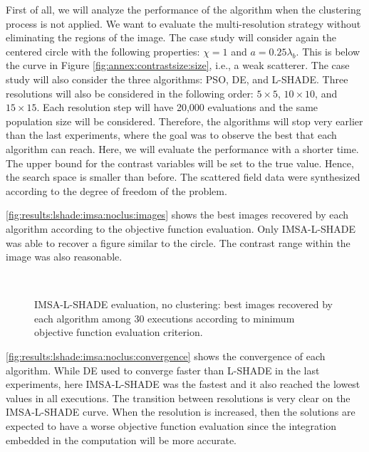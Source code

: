 			First of all, we will analyze the performance of the algorithm when the clustering process is not applied. We want to evaluate the multi-resolution strategy without eliminating the regions of the image. The case study will consider again the centered circle with the following properties: $\chi=1$ and $a=0.25\lambda_b$. This is below the curve in Figure \ref{fig:annex:contrastsize:size}, i.e., a weak scatterer. The case study will also consider the three algorithms: PSO, DE, and L-SHADE. Three resolutions will also be considered in the following order: $5\times5$, $10\times10$, and $15\times15$. Each resolution step will have 20,000 evaluations and the same population size will be considered. Therefore, the algorithms will stop very earlier than the last experiments, where the goal was to observe the best that each algorithm can reach. Here, we will evaluate the performance with a shorter time. The upper bound for the contrast variables will be set to the true value. Hence, the search space is smaller than before. The scattered field data were synthesized according to the degree of freedom of the problem.
			
			\autoref{fig:results:lshade:imsa:noclus:images} shows the best images recovered by each algorithm according to the objective function evaluation. Only IMSA-L-SHADE was able to recover a figure similar to the circle. The contrast range within the image was also reasonable.
			
			\begin{figure}
				\centering
				 \\
				\caption[IMSA-L-SHADE evaluation, no clustering: best recovered images.]{IMSA-L-SHADE evaluation, no clustering: best images recovered by each algorithm among 30 executions according to minimum objective function evaluation criterion.}
				\label{fig:results:lshade:imsa:noclus:images}
			\end{figure}
		
			\autoref{fig:results:lshade:imsa:noclus:convergence} shows the convergence of each algorithm. While DE used to converge faster than L-SHADE in the last experiments, here IMSA-L-SHADE was the fastest and it also reached the lowest values in all executions. The transition between resolutions is very clear on the IMSA-L-SHADE curve. When the resolution is increased, then the solutions are expected to have a worse objective function evaluation since the integration embedded in the computation will be more accurate.
							
